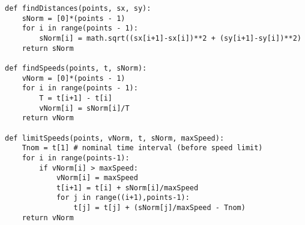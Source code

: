 \begin{verbatim}
def findDistances(points, sx, sy):
    sNorm = [0]*(points - 1)
    for i in range(points - 1):
        sNorm[i] = math.sqrt((sx[i+1]-sx[i])**2 + (sy[i+1]-sy[i])**2)
    return sNorm

def findSpeeds(points, t, sNorm):
    vNorm = [0]*(points - 1)
    for i in range(points - 1):
        T = t[i+1] - t[i]
        vNorm[i] = sNorm[i]/T
    return vNorm

def limitSpeeds(points, vNorm, t, sNorm, maxSpeed):
    Tnom = t[1] # nominal time interval (before speed limit)
    for i in range(points-1):
        if vNorm[i] > maxSpeed:
            vNorm[i] = maxSpeed
            t[i+1] = t[i] + sNorm[i]/maxSpeed
            for j in range((i+1),points-1):
                t[j] = t[j] + (sNorm[j]/maxSpeed - Tnom)
    return vNorm

\end{verbatim}